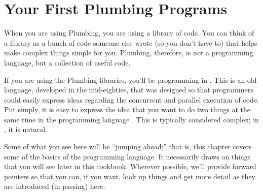 \chapter{Your First Plumbing Programs\label{ch1}}
When you are using Plumbing, you are using a library of code. You can think of a library as a bunch of code someone else wrote (so you don't have to) that helps make complex things simple for you. Plumbing, therefore, is not a programming language, but a collection of useful code.

If you are using the Plumbing libraries, you'll be programming in \occam. This is an old language, developed in the mid-eighties, that was designed so that programmers could easily express ideas regarding the concurrent and parallel execution of code. Put simply, it is easy to express the idea that you want to do two things at the same time in the programming language \occam. This is typically considered complex; in \occam, it is natural.

Some of what you see here will be ``jumping ahead;'' that is, this chapter covers some of the basics of the \occam programming language. It necessarily draws on things that you will see later in this cookbook. Wherever possible, we'll provide forward pointers so that you can, if you want, look up things and get more detail as they are introduced (in passing) here. 











